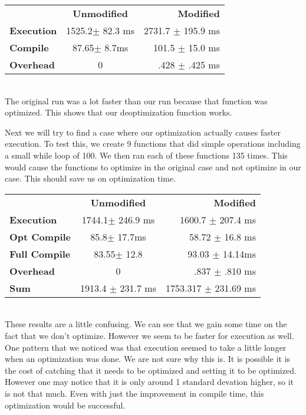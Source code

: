 \documentclass[twocolumn,showpacs,%
  nofootinbib,aps,superscriptaddress,%
  eqsecnum,prd,notitlepage,showkeys,10pt]{revtex4-1}
\begin{document}
\begin{tabular}{ l c r }
  & \textbf{Unmodified} & \textbf{Modified} \\
\textbf{Execution} &  1525.2$\pm$ 82.3 ms &  2731.7 $\pm$ 195.9 ms \\
\textbf{Compile} & 87.65$\pm$ 8.7ms & 101.5 $\pm$ 15.0 ms \\
\textbf{Overhead} &  0   &   .428 $\pm$ .425 ms  \\
\end{tabular}\\

The original run was a lot faster than our run because that function was optimized. This shows that our deoptimization function works.

Next we will try to find a case where our optimization actually causes faster execution. To test this, we create 9 functions that did simple operations including a small while loop of 100. We then ran each of these functions 135 times. This would cause the functions to optimize in the original case and not optimize in our case. This should save us on optimization time.\\

\begin{tabular}{ l c r }
  & \textbf{Unmodified} & \textbf{Modified} \\
\textbf{Execution} &  1744.1$\pm$ 246.9 ms &  1600.7 $\pm$ 207.4 ms \\
\textbf{Opt Compile} & 85.8$\pm$  17.7ms & 58.72 $\pm$ 16.8 ms \\
\textbf{Full Compile} &  83.55$\pm$ 12.8 & 93.03 $\pm$ 14.14ms\\ 
\textbf{Overhead} &  0   &   .837 $\pm$ .810 ms  \\
\textbf{Sum} & 1913.4 $\pm$ 231.7 ms & 1753.317 $\pm$ 231.69 ms \\

\end{tabular}\\

These results are a little confusing. We can see that we gain some time on the fact that we don't optimize. However we seem to be faster for execution as well. One pattern that we noticed was that execution seemed to take a little longer when an optimization was done. We are not sure why this is. It is possible it is  the cost of catching that it needs to be optimized and setting it to be optimized. However one may notice that it is only around 1 standard devation higher, so it is not that much. Even with just the improvement in compile time, this optimization would be successful. 
\end{document}
